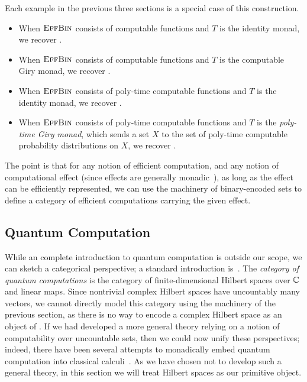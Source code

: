 \begin{ex}
  Each example in the previous three sections is a special case of this
  construction.
  \begin{itemize}
    \item When ${\textsc{\text{EffBin}}}$ consists of computable functions and $T$ is the identity
      monad, we recover .
    \item When ${\textsc{\text{EffBin}}}$ consists of computable functions and $T$ is the
      computable Giry monad, we recover .
    \item When ${\textsc{\text{EffBin}}}$ consists of poly-time computable functions and $T$
      is the identity monad, we recover .
    \item When ${\textsc{\text{EffBin}}}$ consists of poly-time computable functions and $T$
      is the \emph{poly-time Giry monad}, which sends a set $X$ to the set of
      poly-time computable probability distributions on $X$, we recover
      .
  \end{itemize}
\end{ex}

The point is that for any notion of efficient computation, and any notion of
computational effect (since effects are generally
monadic~\cite{wadler-thiemann-2003}), as long as the effect can be efficiently
represented, we can use the machinery of binary-encoded sets to define a
category of efficient computations carrying the given effect.

\subsection{Quantum Computation}

While an complete introduction to quantum computation is outside our scope, we
can sketch a categorical perspective; a standard introduction
is~\cite{nielsen-chuang-2010}. The \emph{category of quantum computations}
 is the category of finite-dimensional Hilbert spaces over $\mathbb{C}$ and
linear maps. Since nontrivial complex Hilbert spaces have
uncountably many vectors, we cannot directly model this category using the
machinery of the previous section, as there is no way to encode a complex
Hilbert space as an object of . If we had developed a more general
theory relying on a notion of computability over uncountable sets, then we could
now unify these perspectives; indeed, there have been several attempts to
monadically embed quantum computation into classical
calculi~\cite{altenrich-green-2009,abramsky-2017}. As we have chosen not to
develop such a general theory, in this section we will treat Hilbert spaces as
our primitive object.

